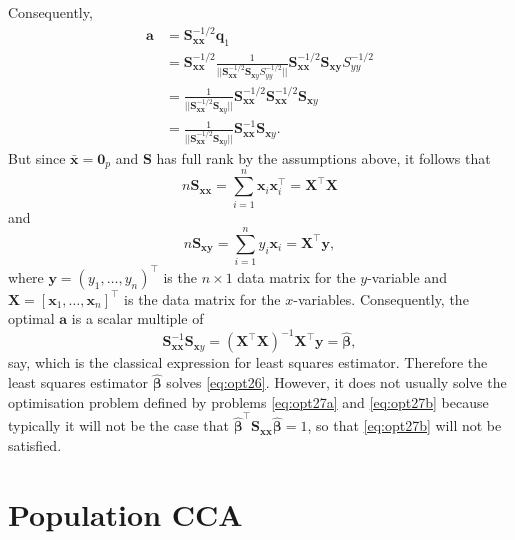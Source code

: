 \documentclass[]{book}
\theoremstyle{definition}
\theoremstyle{definition}
\theoremstyle{definition}
\theoremstyle{remark}
\begin{document}
Consequently,
\begin{align*}
\boldsymbol a&=\boldsymbol S_{\boldsymbol x\boldsymbol x}^{-1/2}\boldsymbol q_1\\
&=\boldsymbol S_{\boldsymbol x\boldsymbol x}^{-1/2} \frac{1}{\vert \vert \boldsymbol S_{\boldsymbol x\boldsymbol x}^{-1/2}\boldsymbol S_{\boldsymbol xy}S_{yy}^{-1/2}\vert \vert}\boldsymbol S_{\boldsymbol x\boldsymbol x}^{-1/2}\boldsymbol S_{\boldsymbol x\boldsymbol y}S_{yy}^{-1/2}\\
&=\frac{1}{\vert \vert \boldsymbol S_{\boldsymbol x\boldsymbol x}^{-1/2}\boldsymbol S_{\boldsymbol xy}\vert \vert}\boldsymbol S_{\boldsymbol x\boldsymbol x}^{-1/2}\boldsymbol S_{\boldsymbol x\boldsymbol x}^{-1/2}\boldsymbol S_{\boldsymbol xy}\\
&=\frac{1}{\vert \vert \boldsymbol S_{\boldsymbol x\boldsymbol x}^{-1/2}\boldsymbol S_{\boldsymbol xy}\vert \vert}\boldsymbol S_{\boldsymbol x\boldsymbol x}^{-1}\boldsymbol S_{\boldsymbol xy}.
\end{align*}
But since \(\bar{\boldsymbol x}={\mathbf 0}_p\) and \(\boldsymbol S\) has full rank by the assumptions above, it follows that
\[
n\boldsymbol S_{\boldsymbol x\boldsymbol x} =\sum_{i=1}^n \boldsymbol x_i \boldsymbol x_i^\top =\boldsymbol X^\top \boldsymbol X
\]
and
\[
 n\boldsymbol S_{\boldsymbol x\boldsymbol y}=\sum_{i=1}^n y_i \boldsymbol x_i=\boldsymbol X^\top \boldsymbol y,
\]
where \(\boldsymbol y=(y_1, \ldots ,y_n)^\top\) is the \(n \times 1\) data matrix for the \(y\)-variable and \(\boldsymbol X=[\boldsymbol x_1, \ldots , \boldsymbol x_n]^\top\) is the data matrix for the \(x\)-variables.
Consequently, the optimal \(\boldsymbol a\) is a scalar multiple of
\[
\boldsymbol S_{\boldsymbol x\boldsymbol x}^{-1}\boldsymbol S_{\boldsymbol xy}=\left ( \boldsymbol X^\top \boldsymbol X\right )^{-1} \boldsymbol X^\top \boldsymbol y=\hat{\pmb \beta},
\]
say, which is the classical expression for least squares estimator. Therefore the least squares estimator \(\hat{\pmb \beta}\) solves \eqref{eq:opt26}. However, it does not usually solve the optimisation problem defined by problems \eqref{eq:opt27a} and \eqref{eq:opt27b} because typically it will not be the case that \(\hat{\pmb \beta}^\top \boldsymbol S_{\boldsymbol x\boldsymbol x}\hat{\pmb \beta}=1\), so that \eqref{eq:opt27b} will not be satisfied.

\hypertarget{population-cca}{%
\section{Population CCA}\label{population-cca}}
\end{document}
